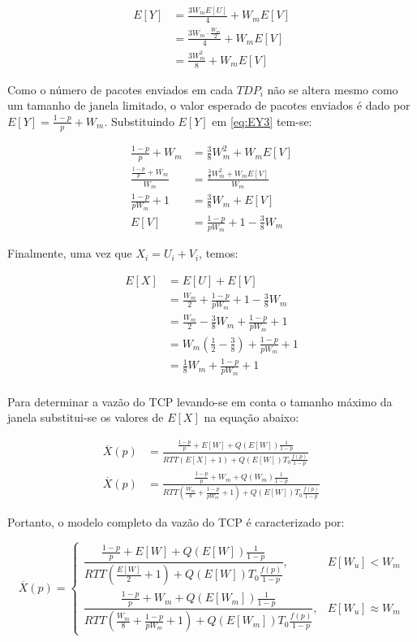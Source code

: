 \begin{align} \label{eq:EY3}
  \nonumber E[Y] &= \frac{3W_mE[U]}{4} + W_mE[V]\\
  \nonumber     &= \frac{3W_m\cdot \frac{W_m}{2}}{4} + W_mE[V]\\
      &= \frac{3W_m^2}{8} + W_mE[V]
\end{align}

Como o número de pacotes enviados em cada $TDP_i$ não se altera mesmo como um tamanho de janela limitado, o valor esperado de pacotes enviados é dado por $E[Y]=\frac{1-p}{p} + W_m$. Substituindo $E[Y]$ em \ref{eq:EY3} tem-se:

\begin{align} \label{eq:EY4}
  \nonumber \frac{1-p}{p} + W_m &= \frac{3}{8}W_m^2+W_mE[V]\\
  \nonumber \frac{ \frac{1-p}{p} + W_m }{W_m} &= \frac{ \frac{3}{8}W_m^2+W_mE[V] }{W_m}\\
  \nonumber \frac{1-p}{pW_m} + 1 &= \frac{3}{8}W_m+E[V]\\
  E[V] &= \frac{1-p}{pW_m} + 1 - \frac{3}{8}W_m
\end{align}

Finalmente, uma vez que $X_i=U_i+V_i$, temos:

\begin{align} \label{eq:EX}
  \nonumber E[X] &= E[U] + E[V]\\
  \nonumber &= \frac{W_m}{2} + \frac{1-p}{pW_m} + 1 - \frac{3}{8}W_m\\
  \nonumber &= \frac{W_m}{2} - \frac{3}{8}W_m + \frac{1-p}{pW_m} + 1\\
  \nonumber &= W_m(\frac{1}{2} - \frac{3}{8}) + \frac{1-p}{pW_m} + 1\\
  \nonumber &= \frac{1}{8}W_m + \frac{1-p}{pW_m} + 1\\
\end{align}

Para determinar a vazão do TCP levando-se em conta o tamanho máximo da janela substitui-se os valores de $E[X]$ na equação abaixo:

\begin{align} \label{eq:EX2}
  \nonumber  \overline{X}(p) &= \frac{\frac{1-p}{p}+E[W]+Q(E[W])\frac{1}{1-p}}{RTT(E[X]+1)+Q(E[W])T_0\frac{f(p)}{1-p}}\\
  \nonumber  \overline{X}(p) &= \frac{\frac{1-p}{p}+W_m+Q(W_m)\frac{1}{1-p}}{RTT(\frac{W_m}{8}+\frac{1-p}{pW_m}+1)+Q(E[W])T_0\frac{f(p)}{1-p}}
\end{align}

Portanto, o modelo completo da vazão do TCP é caracterizado por:

\begin{equation*}
\overline{X}(p)= 
\begin{cases} \dfrac{\frac{1-p}{p}+E[W]+Q(E[W])\frac{1}{1-p}}{RTT(\frac{E[W]}{2}+1)+Q(E[W])T_0\frac{f(p)}{1-p}}, & E[W_u]<W_m \\
\dfrac{\frac{1-p}{p}+W_m+Q(E[W_m])\frac{1}{1-p}}{RTT(\frac{W_m}{8}+\frac{1-p}{pW_m}+1)+Q(E[W_m])T_0\frac{f(p)}{1-p}}, & E[W_u]\approx W_m
\end{cases}
\label{eq:03}
\end{equation*}
